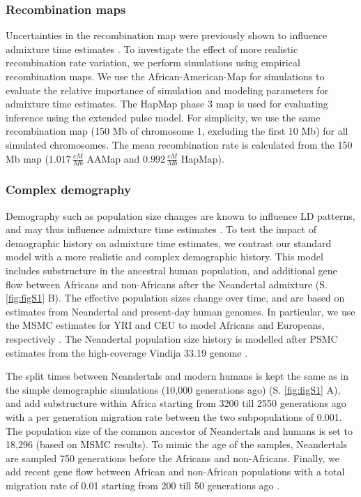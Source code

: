 \documentclass[]{article}
\begin{document}
\subsubsection{Recombination maps}\label{recombination map}
Uncertainties in the recombination map were previously shown to influence admixture time estimates \citep{sankararaman_date_2012,sankararaman_combined_2016,fu_genome_2014}. To investigate the effect of more realistic
recombination rate variation, we perform simulations using empirical recombination maps. We use the  African-American-Map \citep{hinch_landscape_2011} for simulations to evaluate the relative importance of simulation and modeling parameters for admixture time estimates. The HapMap phase 3 map \citep{HapMapConsortium_second_2007} is used for evaluating inference using the extended pulse model. For simplicity, we use the same
recombination map (150 Mb of chromosome 1, excluding the first 10 Mb)
for all simulated chromosomes. The mean recombination rate is
calculated from the 150 Mb map (\(1.017 \, \frac{cM}{Mb}\) AAMap and
\(0.992 \, \frac{cM}{Mb}\) HapMap).



\subsubsection{Complex demography}\label{inferred demography}
Demography such as population size changes are known to influence LD
patterns, and may thus influence admixture time estimates \citep{gravel_population_2012,liang_lengths_2014}. To test the impact of
demographic history on admixture time estimates, we contrast our standard model with a more 
realistic and complex demographic history. This model includes substructure in the ancestral human population, and additional gene flow between Africans and non-Africans after the Neandertal admixture (S. \ref{fig:figS1} B). The effective population
sizes change over time, and are based on estimates from Neandertal and present-day human genomes. In particular, we use the MSMC estimates for YRI and CEU to model Africans and Europeans, respectively 
\citep{schiffels_inferring_2014}. The Neandertal population size history is modelled after  PSMC estimates \citep{li_inference_2011} from the high-coverage Vindija 33.19 genome
\citep{mafessoni_high_coverage_2020}. 

The split times between Neandertals and
modern humans is kept the
same as in the simple demographic simulations (10,000 generations ago) (S. \ref{fig:figS1} A), and add substructure within Africa starting from 3200 till 2550 generations ago with a per generation migration rate between the two subpopulations of 0.001. The population size of the common ancestor of Neandertals and humans  is set to 18,296 (based on MSMC results). To mimic the age of the samples, Neandertals are sampled 750 generations before the Africans and non-Africans. Finally, we add recent gene flow between African and non-African populations with a total migration rate of 0.01 starting from 200 till 50 generations ago \citep{petr_limits_2019}.
\end{document}
